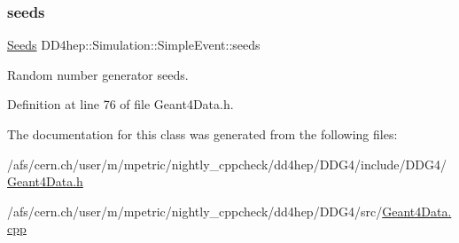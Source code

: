 \subsubsection{\texorpdfstring{seeds}{seeds}}
{\footnotesize\ttfamily \hyperlink{class_d_d4hep_1_1_simulation_1_1_simple_event_a0a0e9b422036edb384b60a6f492eb8d4}{Seeds} D\+D4hep\+::\+Simulation\+::\+Simple\+Event\+::seeds}



Random number generator seeds. 



Definition at line 76 of file Geant4\+Data.\+h.



The documentation for this class was generated from the following files\+:\begin{DoxyCompactItemize}
\item 
/afs/cern.\+ch/user/m/mpetric/nightly\+\_\+cppcheck/dd4hep/\+D\+D\+G4/include/\+D\+D\+G4/\hyperlink{_geant4_data_8h}{Geant4\+Data.\+h}\item 
/afs/cern.\+ch/user/m/mpetric/nightly\+\_\+cppcheck/dd4hep/\+D\+D\+G4/src/\hyperlink{_geant4_data_8cpp}{Geant4\+Data.\+cpp}\end{DoxyCompactItemize}

